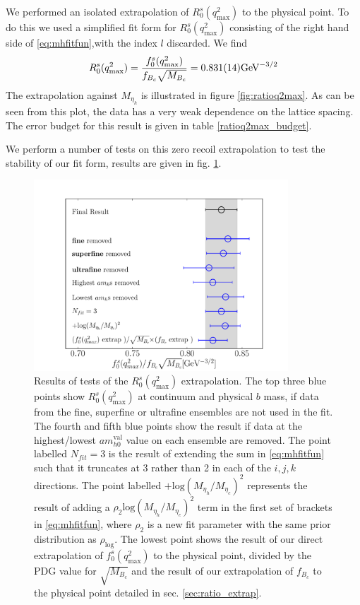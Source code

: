 We performed an isolated extrapolation of $R^s_0(q^2_{\text{max}})$ to the physical point. To do this we used a simplified fit form for $R^s_0(q^2_{\text{max}})$ consisting of the right hand side of \eqref{eq:mhfitfun},with the index $l$ discarded. We find
\begin{align}
  R_0^s(q^2_{\text{max}}) = {f_0^s(q^2_{\text{max}})\over f_{B_c}\sqrt{M_{B_c}}} = 0.831(14) \text{GeV}^{-3/2}
\end{align}
The extrapolation against $M_{\eta_h}$ is illustrated in figure \ref{fig:ratioq2max}. As can be seen from this plot, the data has a very weak dependence on the lattice spacing. The error budget for this result is given in table \ref{ratioq2max_budget}.

We perform a number of tests on this zero recoil extrapolation to test the stability of our fit form, results are given in fig. \ref{fig:ratiotests}.

\begin{figure}[htb!]
  \begin{center}
  \hspace{-20pt}
  \includegraphics[width=0.85\textwidth]{images/BsDs/ratio/f0dcq2max_stability.pdf}
  \caption{ Results of tests of the $R_0^s(q^2_{\text{max}})$ extrapolation. The top three blue points show $R_0^s(q^2_{\text{max}})$ at continuum and physical $b$ mass, if data from the fine, superfine or ultrafine ensembles are not used in the fit. The fourth and fifth blue points show the result if data at the highest/lowest $am_{h0}^{\text{val}}$ value on each ensemble are removed. The point labelled $N_{fit}=3$ is the result of extending the sum in \eqref{eq:mhfitfun} such that it truncates at 3 rather than 2 in each of the $i,j,k$ directions. The point labelled $+\text{log}(M_{\eta_h}/M_{\eta_c})^2$ represents the result of adding a $\rho_{2} \text{log}(M_{\eta_h}/M_{\eta_c})^2$ term in the first set of brackets in \eqref{eq:mhfitfun}, where $\rho_{2}$ is a new fit parameter with the same prior distribution as $\rho_{\text{log}}$. The lowest point shows the result of our direct extrapolation of $f_0^s(q^2_{\text{max}})$ to the physical point, divided by the PDG value for $\sqrt{M_{B_c}}$ \cite{PhysRevD.98.030001} and the result of our extrapolation of $f_{B_c}$ to the physical point detailed in sec. \ref{sec:ratio_extrap}.
    \label{fig:ratiotests}}
  \end{center}
\end{figure}

